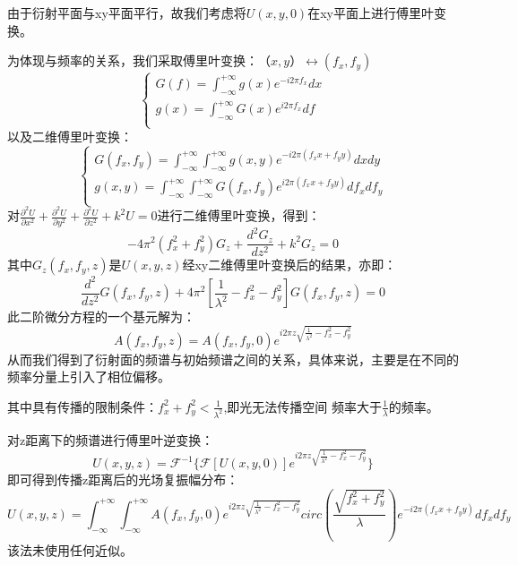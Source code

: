 \documentclass[a4paper,12pt]{article}
\begin{document}
		\noindent 由于衍射平面与xy平面平行，故我们考虑将$U(x,y,0)$在xy平面上进行傅里叶变换。
		
		\noindent 为体现与频率的关系，我们采取傅里叶变换：$（x,y）\leftrightarrow(f_x,f_y)$
		$$
		\begin{cases}
			G(f)=\int^{+\infty}_{-\infty}g(x)e^{-i2\pi f_x}dx\\
			g(x)=\int^{+\infty}_{-\infty}G(x)e^{i2\pi f_x}df\\
		\end{cases}
		$$
		以及二维傅里叶变换：
		$$
		\begin{cases}
			G(f_x,f_y)=\int^{+\infty}_{-\infty}\int^{+\infty}_{-\infty}g(x,y)e^{-i2\pi (f_xx+f_yy)}dxdy\\
			g(x,y)=\int^{+\infty}_{-\infty}\int^{+\infty}_{-\infty}G(f_x,f_y)e^{i2\pi (f_xx+f_yy)}df_xdf_y\\
		\end{cases}
		$$
		对$\frac{\partial^2 U}{\partial x^2}+\frac{\partial^2 U}{\partial y^2}+\frac{\partial^2 U}{\partial z^2}+k^2U=0$进行二维傅里叶变换，得到：
		$$
		-4\pi^2(f_x^2+f_y^2)G_z+\frac{d^2 G_z}{d z^2}+k^2G_z=0
		$$
		其中$G_z(f_x,f_y,z)$是$U(x,y,z)$经xy二维傅里叶变换后的结果，亦即：
		$$
		\frac{d^2}{dz^2}G(f_x,f_y,z)+4\pi^2[\frac{1}{\lambda^2}-f_x^2-f_y^2]G(f_x,f_y,z)=0
		$$
		此二阶微分方程的一个基元解为：
		$$
		A(f_x,f_y,z)=A(f_x,f_y,0)e^{i2\pi z\sqrt{\frac{1}{\lambda^2}-f_x^2-f_y^2}}
		$$
		从而我们得到了衍射面的频谱与初始频谱之间的关系，具体来说，主要是在不同的频率分量上引入了相位偏移。
		
		\noindent 其中具有传播的限制条件：$f_x^2+f_y^2<\frac{1}{\lambda^2}$,即光无法传播空间 频率大于$\frac{1}{\lambda}$的频率。
		
		\noindent 对z距离下的频谱进行傅里叶逆变换：
		$$
		U(x,y,z)=\mathcal F^{-1}\{\mathcal F[U(x,y,0)]e^{i2\pi z\sqrt{\frac{1}{\lambda^2}-f_x^2-f_y^2}}\}
		$$
		即可得到传播z距离后的光场复振幅分布：
		$$
		U(x,y,z)=\int_{-\infty}^{+\infty}\int_{-\infty}^{+\infty}A(f_x,f_y,0)e^{i2\pi z\sqrt{\frac{1}{\lambda^2}-f_x^2-f_y^2}}circ(\frac{\sqrt{f_x^2+f_y^2}}{\lambda})e^{-i2\pi (f_xx+f_yy)}df_xdf_y
		$$
		该法未使用任何近似。
	
\end{document}
